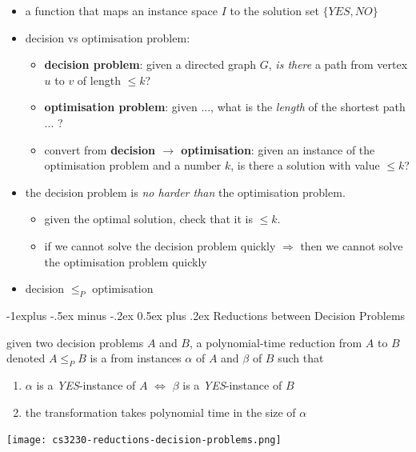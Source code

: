 \documentclass[10pt, landscape]{article}
\makeatletter
\renewcommand{\subsection}{\@startsection{subsection}{2}{0mm}%
  {-1explus -.5ex minus -.2ex}%
  {0.5ex plus .2ex}%
{\normalfont\normalsize\bfseries}}
\makeatother
\begin{document}
\begin{multicols*}{4}
  \begin{itemize}
    \item {} a function that maps an instance space $I$ to the solution set $\{YES, NO\}$
    \item decision vs optimisation problem:
      \begin{itemize}
        \item \textbf{decision problem}: given a directed graph $G$, \textit{is there} a path from vertex $u$ to $v$ of length $\leq k$?
        \item \textbf{optimisation problem}: given ..., what is the \textit{length} of the shortest path ... ?
        \item convert from \textbf{decision $\rightarrow$ optimisation}: given an instance of the optimisation problem and a number $k$, is there a solution with value $\leq k$?
      \end{itemize}
    \item the decision problem is \textit{no harder than} the optimisation problem.
      \begin{itemize}
        \item given the optimal solution, check that it is $\leq k$.
        \item if we cannot solve the decision problem quickly $\Rightarrow$ then we cannot solve the optimisation problem quickly
      \end{itemize}
    \item decision $\leq_P$ optimisation
  \end{itemize}

  \subsection{Reductions between Decision Problems}

  given two decision problems $A$ and $B$, a polynomial-time reduction from $A$ to $B$ denoted $A \leq_P B$ is a  from instances $\alpha$ of $A$ and $\beta$ of $B$ such that
  \begin{enumerate}
    \item $\alpha$ is a \textit{YES}-instance of $A$ $\iff$ $\beta$ is a \textit{YES}-instance of $B$
    \item the transformation takes polynomial time in the size of $\alpha$
  \end{enumerate}

  \begin{tightcenter}
    \texttt{[image: cs3230-reductions-decision-problems.png]} 
  \end{tightcenter}


\end{multicols*}
\end{document}
